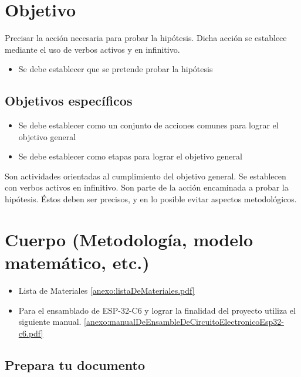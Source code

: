     \section{Objetivo}
    
    Precisar la acción necesaria para probar la hipótesis. Dicha acción se establece mediante el uso de verbos activos y en infinitivo.
    \begin{itemize}
        \item Se debe establecer que se pretende probar la hipótesis
    \end{itemize}
    
    \subsection{Objetivos específicos }
    
    \begin{itemize}
        \item Se debe establecer como un conjunto de acciones comunes para lograr el objetivo general
        \item Se debe establecer como etapas para lograr el objetivo general
    \end{itemize}
    
    Son actividades orientadas al cumplimiento del objetivo general. Se establecen con verbos activos en infinitivo. Son parte de la acción encaminada a probar la hipótesis. Éstos deben ser precisos, y en lo posible evitar aspectos metodológicos.
    \section{Cuerpo (Metodología, modelo matemático, etc.)}
    
    \begin{itemize}
        \item Lista de Materiales 
        \ref{anexo:listaDeMateriales.pdf}
    \end{itemize}

    \begin{itemize}
        \item Para el ensamblado de ESP-32-C6 y lograr la finalidad del proyecto utiliza el siguiente manual.
        \ref{anexo:manualDeEnsambleDeCircuitoElectronicoEsp32-c6.pdf}
    \end{itemize}


\subsection{Prepara tu documento}


